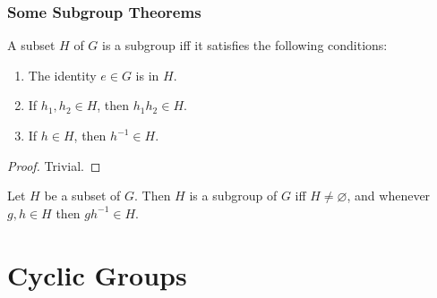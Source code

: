 \documentclass[12pt, letterpaper]{report}
\begin{document}
\subsection*{Some Subgroup Theorems}
\begin{proposition}
	A subset \(H\) of \(G\) is a subgroup iff it satisfies the following conditions:
	\begin{enumerate}
		\item The identity \(e\in G\) is in \(H\). 
		\item If \(h_1,h_2\in H\), then \(h_1 h_2\in H\).
		\item If \(h\in H\), then \(h^{-1} \in H\).
	\end{enumerate}
\end{proposition}
\begin{proof}
	Trivial.
\end{proof}
\begin{proposition}
	Let \(H\) be a subset of \(G\). Then \(H\) is a subgroup of \(G\) iff \(H\neq \varnothing \), and whenever \(g,h\in H\) then \(gh^{-1} \in H\).
\end{proposition}
\chapter{Cyclic Groups}
\end{document}
